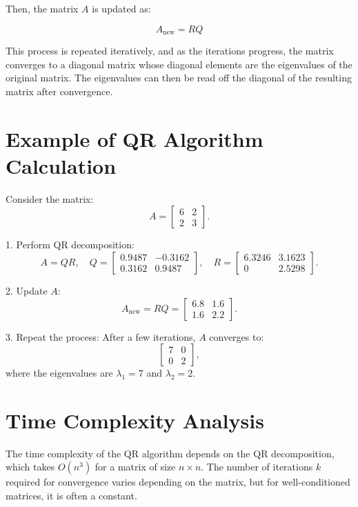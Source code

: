 \documentclass[a4paper,12pt]{report}
\begin{document}
Then, the matrix \( A \) is updated as:

\[
A_{\text{new}} = RQ
\]

This process is repeated iteratively, and as the iterations progress, the matrix converges to a diagonal matrix whose diagonal elements are the eigenvalues of the original matrix. The eigenvalues can then be read off the diagonal of the resulting matrix after convergence.

\section*{\textcolor{myblue}{Example of QR Algorithm Calculation}}
Consider the matrix:
\[
A = \begin{bmatrix}
6 & 2 \\
2 & 3
\end{bmatrix}.
\]

1. Perform QR decomposition:
   \[
   A = QR, \quad Q = \begin{bmatrix}
   0.9487 & -0.3162 \\
   0.3162 & 0.9487
   \end{bmatrix}, \quad R = \begin{bmatrix}
   6.3246 & 3.1623 \\
   0 & 2.5298
   \end{bmatrix}.
   \]

2. Update \( A \):
   \[
   A_{\text{new}} = RQ = \begin{bmatrix}
   6.8 & 1.6 \\
   1.6 & 2.2
   \end{bmatrix}.
   \]

3. Repeat the process:
   After a few iterations, \( A \) converges to:
   \[
   \begin{bmatrix}
   7 & 0 \\
   0 & 2
   \end{bmatrix},
   \]
   where the eigenvalues are \( \lambda_1 = 7 \) and \( \lambda_2 = 2 \).
   
\section*{\textcolor{myblue}{Time Complexity Analysis}}
The time complexity of the QR algorithm depends on the QR decomposition, which takes \( O(n^3) \) for a matrix of size \( n \times n \). The number of iterations \( k \) required for convergence varies depending on the matrix, but for well-conditioned matrices, it is often a constant.
\end{document}
